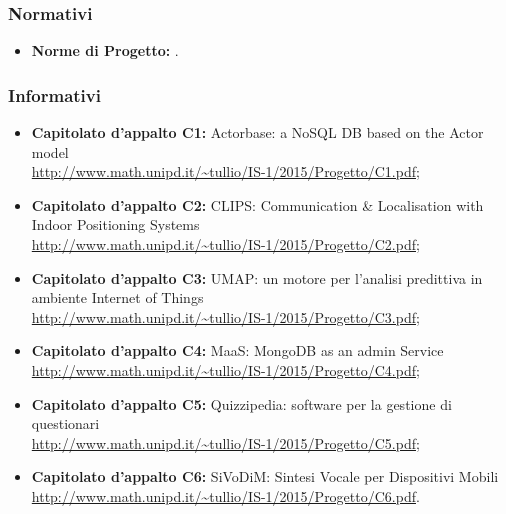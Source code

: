 \subsubsection{Normativi}
\begin{itemize}
\item \textbf{Norme di Progetto:} \NdP.
\end{itemize}

\subsubsection{Informativi}
\begin{itemize}
\item \textbf{Capitolato d'appalto C1:} Actorbase: a NoSQL DB based on the Actor model
\\\url{http://www.math.unipd.it/~tullio/IS-1/2015/Progetto/C1.pdf};
\item \textbf{Capitolato d'appalto C2:} CLIPS: Communication \& Localisation with Indoor Positioning Systems
\\\url{http://www.math.unipd.it/~tullio/IS-1/2015/Progetto/C2.pdf}; 
\item \textbf{Capitolato d'appalto C3:} UMAP: un motore per l'analisi predittiva in ambiente Internet of Things 
\\\url{http://www.math.unipd.it/~tullio/IS-1/2015/Progetto/C3.pdf}; 
\item \textbf{Capitolato d'appalto C4:} MaaS: MongoDB as an admin Service
\\\url{http://www.math.unipd.it/~tullio/IS-1/2015/Progetto/C4.pdf}; 
\item \textbf{Capitolato d'appalto C5:} Quizzipedia: software per la gestione di questionari
\\\url{http://www.math.unipd.it/~tullio/IS-1/2015/Progetto/C5.pdf}; 
\item \textbf{Capitolato d'appalto C6:} SiVoDiM: Sintesi Vocale per Dispositivi Mobili 
\\\url{http://www.math.unipd.it/~tullio/IS-1/2015/Progetto/C6.pdf}.
\end{itemize}